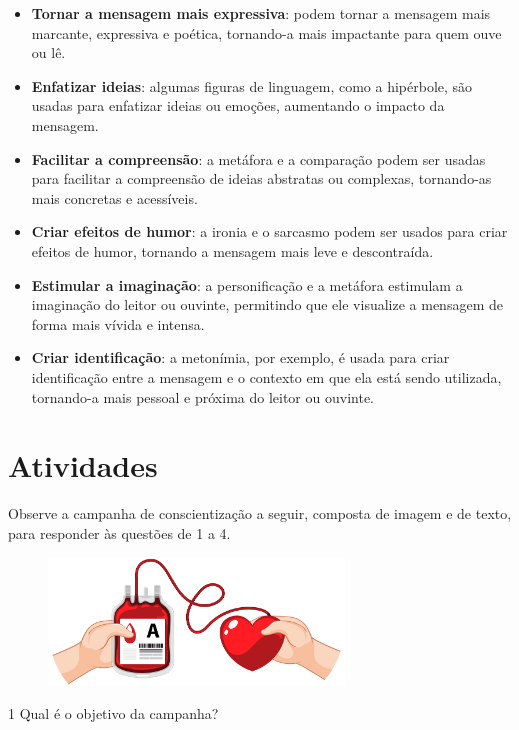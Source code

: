 {\begin{itemize}
\item \textbf{Tornar a mensagem mais expressiva}: podem tornar a mensagem mais
marcante, expressiva e poética, tornando-a mais impactante para quem
ouve ou lê.
\item \textbf{Enfatizar ideias}: algumas figuras de linguagem, como a hipérbole,
são usadas para enfatizar ideias ou emoções, aumentando o impacto da
mensagem.
\item \textbf{Facilitar a compreensão}: a metáfora e a comparação podem ser usadas
para facilitar a compreensão de ideias abstratas ou complexas,
tornando-as mais concretas e acessíveis.
\item \textbf{Criar efeitos de humor}: a ironia e o sarcasmo podem ser usados para
criar efeitos de humor, tornando a mensagem mais leve e descontraída.
\item \textbf{Estimular a imaginação}: a personificação e a metáfora estimulam a
imaginação do leitor ou ouvinte, permitindo que ele visualize a mensagem
de forma mais vívida e intensa.
\item \textbf{Criar identificação}: a metonímia, por exemplo, é usada para criar
identificação entre a mensagem e o contexto em que ela está sendo
utilizada, tornando-a mais pessoal e próxima do leitor ou ouvinte.
\end{itemize}
}

\section*{Atividades}

Observe a campanha de conscientização a seguir, composta de imagem e de
texto, para responder às questões de 1 a 4.

\begin{figure}[H]
\centering\includegraphics[width=0.7\textwidth]{./imgSAEB_6_POR/freepik/PORT_6_IMG-28.jpeg}
\end{figure}

\num{1} Qual é o objetivo da campanha?

